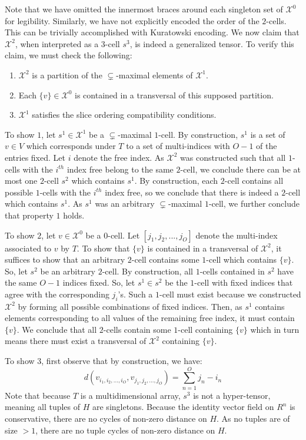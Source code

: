 \documentclass{article}
\theoremstyle{plain}
\theoremstyle{definition}
\theoremstyle{remark}
\newcommand{\cX}{\mathcal{X}}
\begin{document}
	Note that we have omitted the innermost braces around each singleton set of $\cX^0$ for legibility. Similarly, we have not explicitly encoded the order of the $2$-cells. This can be trivially accomplished with Kuratowski encoding. We now claim that $\cX^2$, when interpreted as a $3$-cell $s^3$, is indeed a generalized tensor. To verify this claim, we must check the following:
	\begin{enumerate}
		\item $\cX^2$ is a partition of the $\subsetneq$-maximal elements of $\cX^1$.
		\item Each $\{v\} \in \cX^0$ is contained in a transversal of this supposed partition.
		\item $\cX^1$ satisfies the slice ordering compatibility conditions.
	\end{enumerate}
	To show $1$, let $s^1 \in \cX^1$ be a $\subsetneq$-maximal $1$-cell. By construction, $s^1$ is a set of $v \in V$ which corresponds under $T$ to a set of multi-indices with $O-1$ of the entries fixed. Let $i$ denote the free index. As $\cX^2$ was constructed such that all $1$-cells with the $i^{th}$ index free belong to the same $2$-cell, we conclude there can be at most one $2$-cell $s^2$ which contains $s^1$. By construction, each $2$-cell contains all possible $1$-cells with the $i^{th}$ index free, so we conclude that there is indeed a $2$-cell which contains $s^1$. As $s^1$ was an arbitrary $\subsetneq$-maximal $1$-cell, we further conclude that property $1$ holds.
	
	To show $2$, let $v \in \cX^0$ be a $0$-cell. Let $[j_1, j_2, ..., j_O]$ denote the multi-index associated to $v$ by $T$. To show that $\{v\}$ is contained in a transversal of $\cX^2$, it suffices to show that an arbitrary $2$-cell contains some $1$-cell which contains $\{v\}$. So, let $s^2$ be an arbitrary $2$-cell. By construction, all $1$-cells contained in $s^2$ have the same $O-1$ indices fixed. So, let $s^1 \in s^2$ be the $1$-cell with fixed indices that agree with the corresponding $j_i$'s. Such a $1$-cell must exist because we constructed $\cX^2$ by forming all possible combinations of fixed indices. Then, as $s^1$ contains elements corresponding to all values of the remaining free index, it must contain $\{v\}$. We conclude that all $2$-cells contain some $1$-cell containing $\{v\}$ which in turn means there must exist a transversal of $\cX^2$ containing $\{v\}$.
	
	To show $3$, first observe that by construction, we have:
	\begin{equation*}
		d(v_{i_1, i_2, ..., i_O}, v_{j_1, j_2, ..., j_O}) = \sum_{n=1}^{O} j_n - i_n
	\end{equation*}
	Note that because $T$ is a multidimensional array, $s^3$ is not a hyper-tensor, meaning all tuples of $H$ are singletons. Because the identity vector field on $R^n$ is conservative, there are no cycles of non-zero distance on $H$. As no tuples are of size $ > 1$, there are no tuple cycles of non-zero distance on $H$.
	
\end{document}
